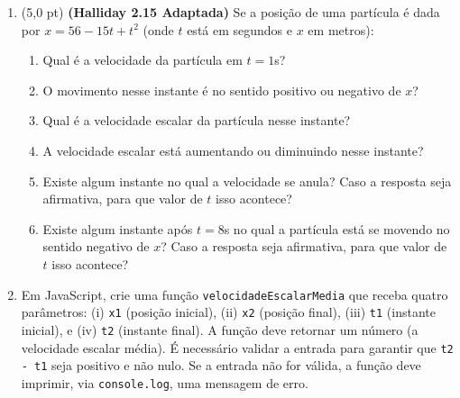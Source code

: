 \documentclass[12pt,a4paper,oneside]{article}
\begin{document}
\begin{enumerate}

\item (5,0 pt) {\bf (Halliday 2.15 Adaptada)} Se a posição de uma partícula é dada por $x = 56 -15t  + t^2$ (onde $t$ está em segundos e $x$ em metros):
\begin{enumerate}
	\item Qual é a velocidade da partícula em $t = 1$s? 
	\item O movimento nesse instante é no sentido positivo ou negativo de $x$? 
	\item Qual é a velocidade escalar da partícula nesse instante?
	\item A velocidade escalar está aumentando	ou diminuindo nesse instante?
	\item Existe algum instante no 	qual a velocidade se anula? Caso a resposta seja afirmativa, para que valor de $t$ isso acontece? 
	\item Existe algum instante após  $t  = 8$s	no qual a partícula está se movendo no sentido negativo de $x$?  Caso a resposta seja afirmativa, para que valor de $t$ isso acontece?
\end{enumerate}


\item Em JavaScript, crie uma função {\tt velocidadeEscalarMedia} que receba quatro parâmetros: (i) {\tt x1} (posição inicial), (ii) {\tt x2} (posição final), (iii) {\tt t1} (instante inicial), e (iv) {\tt t2} (instante final). A função deve retornar um número (a velocidade escalar média). É necessário validar a entrada para garantir que  {\tt t2 - t1} seja positivo e não nulo. Se a entrada não for válida, a função deve imprimir, via {\tt console.log}, uma mensagem de erro.
	
	\end{enumerate}
\end{document}
